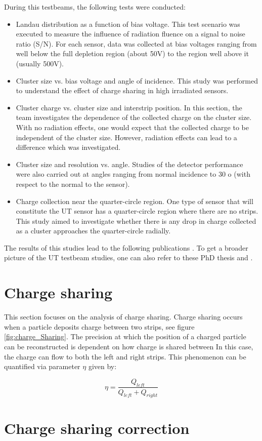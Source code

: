 During this testbeams, the following tests were conducted: 

\begin{itemize}
\item Landau distribution as a function of bias voltage. This test scenario was executed to measure the influence of radiation fluence on a signal to noise ratio (S/N).  For each sensor, data was collected at bias voltages ranging from well below the full depletion region (about 50V) to the region well above it (usually 500V).
\item  Cluster size vs. bias voltage and angle of incidence.  This study was performed to understand the effect of charge sharing in high irradiated sensors. 
\item Cluster charge vs. cluster size and interstrip position. In this section, the team investigates the dependence of the collected charge on the cluster size. With no radiation effects, one would expect that the collected charge to be independent of the cluster size. However, radiation effects can lead to a difference which was investigated. 
\item Cluster size and resolution vs. angle.  Studies of the detector performance were also carried out at angles ranging from normal incidence to 30 o (with respect to the normal to the sensor). 
\item Charge collection near the quarter-circle region. One type of sensor that will constitute the UT sensor has a quarter-circle region where there are no strips. This study aimed to investigate whether there is any drop in charge collected as a cluster approaches the quarter-circle radially. 
\end{itemize}

The results of this studies lead to the following publications \cite{tb1} \cite{tb2} \cite{tb3}. To get a broader picture of the UT testbeam studies, one can also refer to these PhD thesis \cite{Federica} and \cite{Kelsey}.

 
\section{Charge sharing}
This section focuses on the analysis of charge sharing. Charge sharing occurs when a particle deposits charge between two strips, see figure \ref{fig:charge_Sharing}. The precision at which the position of a charged particle can be reconstructed is dependent on how charge is shared between
In this case, the charge can flow to both the left and right strips.  
This phenomenon can be quantified via parameter $\eta$ given by:

\begin{equation}
    \eta = \frac{Q_{left}}{Q_{left}+Q_{right}}
\end{equation}


\section{Charge sharing correction}
